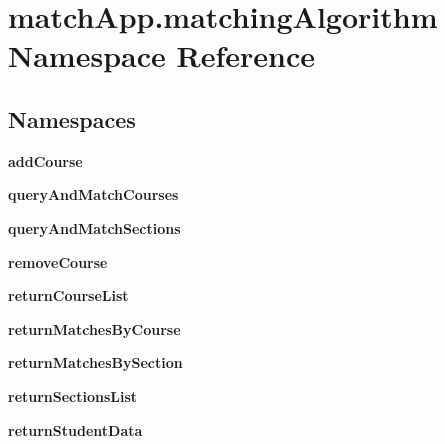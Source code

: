 \section{match\+App.\+matching\+Algorithm Namespace Reference}
\label{namespacematch_app_1_1matching_algorithm}
\subsection*{Namespaces}
\begin{DoxyCompactItemize}
\item 
 {\bf add\+Course}
\item 
 {\bf query\+And\+Match\+Courses}
\item 
 {\bf query\+And\+Match\+Sections}
\item 
 {\bf remove\+Course}
\item 
 {\bf return\+Course\+List}
\item 
 {\bf return\+Matches\+By\+Course}
\item 
 {\bf return\+Matches\+By\+Section}
\item 
 {\bf return\+Sections\+List}
\item 
 {\bf return\+Student\+Data}
\end{DoxyCompactItemize}

